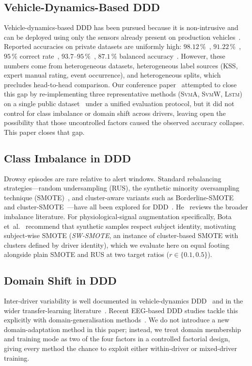 \documentclass[lettersize,journal]{IEEEtran}
\newcommand{\Impl}[1]{\textsc{#1}}
\begin{document}
\subsection{Vehicle-Dynamics-Based DDD}
Vehicle-dynamics-based DDD has been pursued because it is non-intrusive and can be deployed using only the sensors already present on production vehicles~\cite{fu2024,fonseca2025,he2024,kim2025,luo2024,li2026}.
Reported accuracies on private datasets are uniformly high: $98.12\,\%$~\cite{arefnezhad2019}, $91.22\,\%$~\cite{wang2022}, $95\,\%$ correct rate~\cite{zhao2009}, $93.7$--$95\,\%$~\cite{schwarz2019}, $87.1\,\%$ balanced accuracy~\cite{baccour2022}.
However, these numbers come from heterogeneous datasets, heterogeneous label sources (KSS, expert manual rating, event occurrence), and heterogeneous splits, which precludes head-to-head comparison.
Our conference paper~\cite{nakagama2025iv} attempted to close this gap by re-implementing three representative methods (\Impl{SvmA}, \Impl{SvmW}, \Impl{Lstm}) on a single public dataset~\cite{aygun2024} under a unified evaluation protocol, but it did not control for class imbalance or domain shift across drivers, leaving open the possibility that those uncontrolled factors caused the observed accuracy collapse.
This paper closes that gap.

\subsection{Class Imbalance in DDD}
Drowsy episodes are rare relative to alert windows.
Standard rebalancing strategies---random undersampling (RUS), the synthetic minority oversampling technique (SMOTE)~\cite{chawla2002}, and cluster-aware variants such as Borderline-SMOTE~\cite{han2005} and cluster-SMOTE~\cite{douzas2018}---have all been explored for DDD~\cite{yadawadkar2018,he2024}.
He~\cite{he2009} reviews the broader imbalance literature.
For physiological-signal augmentation specifically, Bota et~al.~\cite{bota2024} recommend that synthetic samples respect subject identity, motivating subject-wise SMOTE (\emph{SW-SMOTE}, an instance of cluster-based SMOTE with clusters defined by driver identity), which we evaluate here on equal footing alongside plain SMOTE and RUS at two target ratios ($r \in \{0.1, 0.5\}$).

\subsection{Domain Shift in DDD}
Inter-driver variability is well documented in vehicle-dynamics DDD~\cite{schwarz2019,baccour2022,sun2021,maritsch2022} and in the wider transfer-learning literature~\cite{pan2010,weiss2016}.
Recent EEG-based DDD studies tackle this explicitly with domain-generalisation methods~\cite{kim2025,li2026}.
We do not introduce a new domain-adaptation method in this paper; instead, we treat domain membership and training mode as two of the four factors in a controlled factorial design, giving every method the chance to exploit either within-driver or mixed-driver training.
\end{document}
